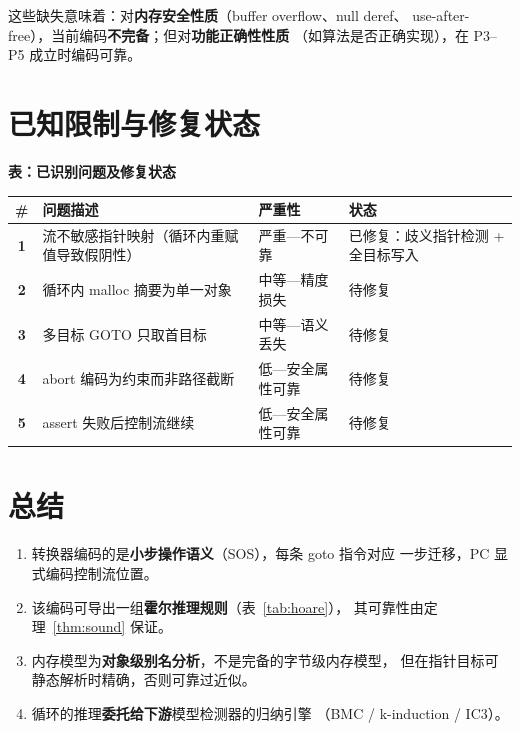 \documentclass[11pt,a4paper]{article}
\begin{document}
这些缺失意味着：对\textbf{内存安全性质}（buffer overflow、null deref、
use-after-free），当前编码\textbf{不完备}；但对\textbf{功能正确性性质}
（如算法是否正确实现），在 P3--P5 成立时编码可靠。

\section{已知限制与修复状态}
\label{sec:limitations}

\begin{center}
\textbf{表：已识别问题及修复状态}
\end{center}
\renewcommand{\arraystretch}{1.3}
\begin{tabular}{>{\bfseries}c p{4cm} p{3.5cm} p{3cm}}
  \toprule
  \# & 问题描述 & 严重性 & 状态 \\
  \midrule
  1 & 流不敏感指针映射（循环内重赋值导致假阴性） & 严重—不可靠 & 已修复：歧义指针检测 + 全目标写入 \\
  2 & 循环内 malloc 摘要为单一对象 & 中等—精度损失 & 待修复 \\
  3 & 多目标 GOTO 只取首目标 & 中等—语义丢失 & 待修复 \\
  4 & abort 编码为约束而非路径截断 & 低—安全属性可靠 & 待修复 \\
  5 & assert 失败后控制流继续 & 低—安全属性可靠 & 待修复 \\
  \bottomrule
\end{tabular}

\section{总结}

\begin{enumerate}
  \item 转换器编码的是\textbf{小步操作语义}（SOS），每条 goto 指令对应
        一步迁移，PC 显式编码控制流位置。
  \item 该编码可导出一组\textbf{霍尔推理规则}（表~\ref{tab:hoare}），
        其可靠性由定理~\ref{thm:sound} 保证。
  \item 内存模型为\textbf{对象级别名分析}，不是完备的字节级内存模型，
        但在指针目标可静态解析时精确，否则可靠过近似。
  \item 循环的推理\textbf{委托给下游}模型检测器的归纳引擎
        （BMC / k-induction / IC3）。
\end{enumerate}
\end{document}
